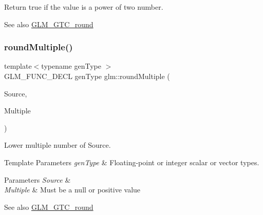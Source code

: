 Return true if the value is a power of two number.

\begin{DoxySeeAlso}{See also}
\hyperlink{group__gtc__round}{G\+L\+M\+\_\+\+G\+T\+C\+\_\+round} 
\end{DoxySeeAlso}
\mbox{\label{group__gtc__round_ga6739d1de04b2cea7c78675b365644bce}} 
\subsubsection{\texorpdfstring{round\+Multiple()}{roundMultiple()}\hspace{0.1cm}{\footnotesize\ttfamily [1/2]}}
{\footnotesize\ttfamily template$<$typename gen\+Type $>$ \\
G\+L\+M\+\_\+\+F\+U\+N\+C\+\_\+\+D\+E\+CL gen\+Type glm\+::round\+Multiple (\begin{DoxyParamCaption}\item[{gen\+Type}]{Source,  }\item[{gen\+Type}]{Multiple }\end{DoxyParamCaption})}

Lower multiple number of Source.


\begin{DoxyTemplParams}{Template Parameters}
{\em gen\+Type} & Floating-\/point or integer scalar or vector types. \\
\hline
\end{DoxyTemplParams}

\begin{DoxyParams}{Parameters}
{\em Source} & \\
\hline
{\em Multiple} & Must be a null or positive value\\
\hline
\end{DoxyParams}
\begin{DoxySeeAlso}{See also}
\hyperlink{group__gtc__round}{G\+L\+M\+\_\+\+G\+T\+C\+\_\+round} 
\end{DoxySeeAlso}
\mbox{\label{group__gtc__round_ga10a8ab7b254257b607b6a3fc68c3e661}} 
